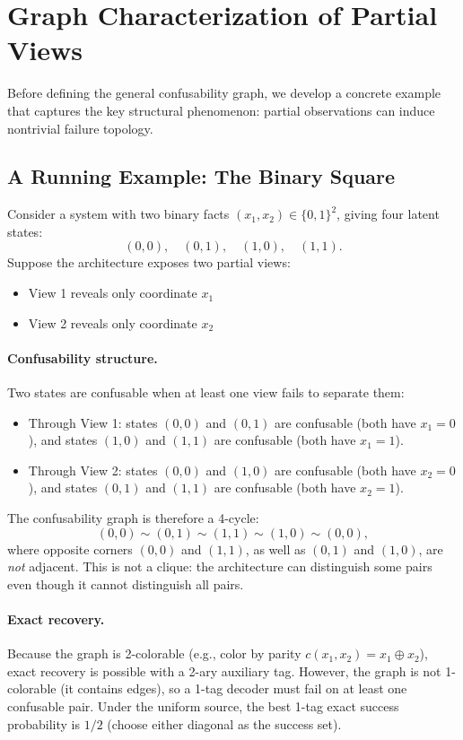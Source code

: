 \section{Graph Characterization of Partial Views}\label{sec:graph-characterization}


Before defining the general confusability graph, we develop a concrete example that captures the key structural phenomenon: partial observations can induce nontrivial failure topology.

\subsection{A Running Example: The Binary Square}\label{sec:binary-square}

Consider a system with two binary facts $(x_1, x_2) \in \{0,1\}^2$, giving four latent states:
\[
(0,0), \quad (0,1), \quad (1,0), \quad (1,1).
\]
Suppose the architecture exposes two partial views:
\begin{itemize}
\item View 1 reveals only coordinate $x_1$
\item View 2 reveals only coordinate $x_2$
\end{itemize}

\paragraph{Confusability structure.}
Two states are confusable when at least one view fails to separate them:
\begin{itemize}
\item Through View 1: states $(0,0)$ and $(0,1)$ are confusable (both have $x_1=0$), and states $(1,0)$ and $(1,1)$ are confusable (both have $x_1=1$).
\item Through View 2: states $(0,0)$ and $(1,0)$ are confusable (both have $x_2=0$), and states $(0,1)$ and $(1,1)$ are confusable (both have $x_2=1$).
\end{itemize}
The confusability graph is therefore a 4-cycle:
\[
(0,0) \sim (0,1) \sim (1,1) \sim (1,0) \sim (0,0),
\]
where opposite corners $(0,0)$ and $(1,1)$, as well as $(0,1)$ and $(1,0)$, are \emph{not} adjacent. This is not a clique: the architecture can distinguish some pairs even though it cannot distinguish all pairs.

\paragraph{Exact recovery.}
Because the graph is 2-colorable (e.g., color by parity $c(x_1,x_2) = x_1 \oplus x_2$), exact recovery is possible with a 2-ary auxiliary tag. However, the graph is not 1-colorable (it contains edges), so a 1-tag decoder must fail on at least one confusable pair. Under the uniform source, the best 1-tag exact success probability is $1/2$ (choose either diagonal as the success set).

